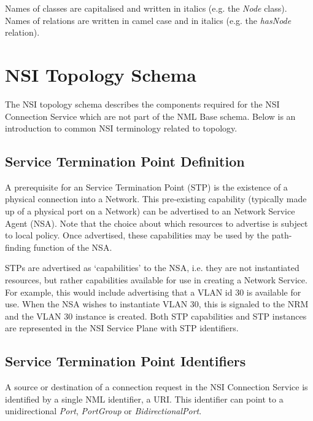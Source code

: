 \documentclass[12pt]{article}  %
\begin{document}
Names of classes are capitalised and written in italics (e.g. the \emph{Node} class).
Names of relations are written in camel case and in italics (e.g. the \emph{hasNode} relation).





\section{NSI Topology Schema}\label{sec:schema}

The NSI topology schema describes the components required for the NSI Connection Service which are not part of the NML Base schema. Below is an introduction to common NSI terminology related to topology.

\subsection{Service Termination Point Definition} %
\label{sub:service_termination_point_definition}

A prerequisite for an Service Termination Point (STP) is the existence of a physical connection into a Network. This pre-existing capability (typically made up of a physical port on a Network) can be advertised to an Network Service Agent (NSA). Note that the choice about which resources to advertise is subject to local policy. Once advertised, these capabilities may be used by the path-finding function of the NSA.

STPs are advertised as `capabilities' to the NSA, i.e. they are not instantiated resources, but rather capabilities available for use in creating a Network Service. For example, this would include advertising that a VLAN id 30 is available for use. When the NSA wishes to instantiate VLAN 30, this is signaled to the NRM and the VLAN 30 instance is created. Both STP capabilities and STP instances are represented in the NSI Service Plane with STP identifiers.


\subsection{Service Termination Point Identifiers}

A source or destination of a connection request in the NSI Connection Service is identified by 
a single NML identifier, a URI. This identifier can point to a unidirectional \emph{Port}, \emph{PortGroup} or \emph{BidirectionalPort}. 
\end{document}
